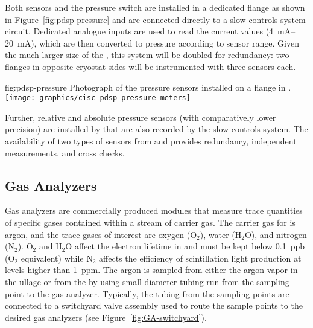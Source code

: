 Both sensors and the pressure switch are installed in a dedicated flange as shown in Figure~\ref{fig:pdsp-pressure} and are connected directly to a slow controls system  circuit. Dedicated analogue inputs are used to read the current values (\SIrange{4}{20}{mA}), which are then converted to pressure according to sensor range. Given the much larger size of the  , this system will be doubled for redundancy: two flanges in opposite cryostat sides will be instrumented with three sensors each. 

\begin{dunefigure}{fig:pdsp-pressure}
  {Photograph of the pressure sensors installed on a flange in .}
  \texttt{[image: graphics/cisc-pdsp-pressure-meters]}
\end{dunefigure}

Further, relative and absolute pressure sensors (with comparatively lower precision) are installed by  that are also recorded by the slow controls system. The availability of two types of sensors from  and  provides redundancy, independent measurements, and cross checks.

\subsection{Gas Analyzers}
\label{sec:fdgen-slow-cryo-gas-anlyz}


 Gas analyzers are commercially produced modules that measure trace quantities of specific gases contained within a stream of carrier gas. The carrier gas for  is argon, and the trace gases of interest are oxygen ($\text{O}_2$), water ($\text{H}_2\text{O}$), and nitrogen ($\text{N}_2$). $\text{O}_2$ and $\text{H}_2\text{O}$ affect the electron lifetime in  and must be kept below \SI{0.1}{ppb} ($\text{O}_2$ equivalent) while $\text{N}_2$ affects the efficiency of scintillation light production at levels higher than \SI{1}{ppm}.
The argon is sampled from either the argon vapor in the ullage or from the  by using small diameter tubing run from the sampling point to the gas analyzer. Typically, the tubing from the sampling points are connected to a switchyard valve assembly used to route the sample points to the desired gas analyzers (see Figure~\ref{fig:GA-switchyard}).


